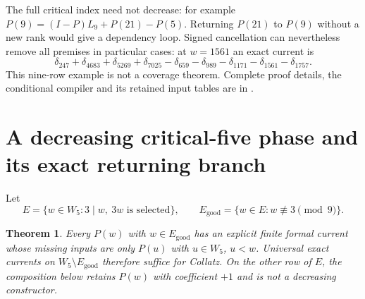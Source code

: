 \documentclass[11pt]{article}
\newtheorem{theorem}{Theorem}
\begin{document}
The full critical index need not decrease: for example
$P(9)=(I-P)L_9+P(21)-P(5)$. Returning $P(21)$ to $P(9)$ without a new
rank would give a dependency loop. Signed cancellation can nevertheless
remove all premises in particular cases: at $w=1561$ an exact current is
\[
 \delta_{247}+\delta_{4683}+\delta_{5269}+\delta_{7025}
 -\delta_{659}-\delta_{989}-\delta_{1171}-\delta_{1561}-\delta_{1757}.
\]
This nine-row example is not a coverage theorem. Complete proof details,
the conditional compiler and its retained input tables are in
.

\section{A decreasing critical-five phase and its exact returning branch}
Let
\[
 E=\{w\in W_5:3\mid w,\ 3w\text{ is selected}\},\qquad
 E_{\mathrm{good}}=\{w\in E:w\not\equiv3\pmod9\}.
\]
\begin{theorem}\label{thm:criticalinverse}
Every $P(w)$ with $w\in E_{\mathrm{good}}$ has an explicit finite formal
current whose missing inputs are only $P(u)$ with $u\in W_5$, $u<w$.
Universal exact currents on $W_5\setminus E_{\mathrm{good}}$ therefore
suffice for Collatz. On the other row of $E$, the composition below
retains $P(w)$ with coefficient $+1$ and is not a decreasing constructor.
\end{theorem}
\end{document}
